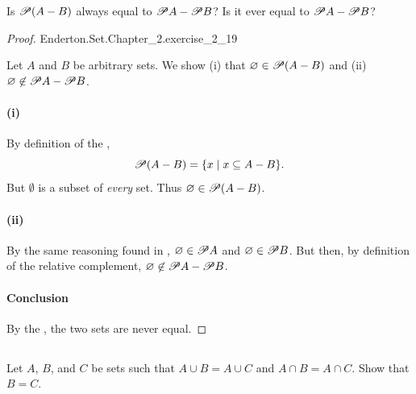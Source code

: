 \documentclass{report}
\begin{document}
Is $\mathscr{P}(A - B)$ always equal to $\mathscr{P}A - \mathscr{P}B$?
Is it ever equal to $\mathscr{P}A - \mathscr{P}B$?

\begin{proof}

    {Enderton.Set.Chapter\_2.exercise\_2\_19}

  Let $A$ and $B$ be arbitrary sets.
  We show (i) that $\varnothing \in \mathscr{P}(A - B)$ and (ii)
    $\varnothing \not\in \mathscr{P}A - \mathscr{P}B$.

  \paragraph{(i)}%
  \label{par:exercise-2.19-i}

    By definition of the ,
      $$\mathscr{P}(A - B) = \{ x \mid x \subseteq A - B \}.$$
    But $\emptyset$ is a subset of \textit{every} set.
    Thus $\varnothing \in \mathscr{P}(A - B)$.

  \paragraph{(ii)}%

    By the same reasoning found in ,
      $\varnothing \in \mathscr{P}A$ and $\varnothing \in \mathscr{P}B$.
    But then, by definition of the relative complement,
      $\varnothing \not\in \mathscr{P}A - \mathscr{P}B$.

  \paragraph{Conclusion}%

    By the , the two sets are never equal.

\end{proof}

\subsection{}%
\label{sub:exercise-2.20}

Let $A$, $B$, and $C$ be sets such that $A \cup B = A \cup C$ and
  $A \cap B = A \cap C$.
Show that $B = C$.
\end{document}
